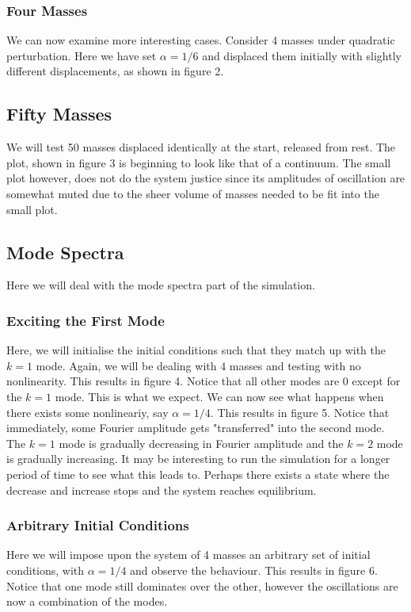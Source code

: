 \documentclass{article}
\begin{document}
\subsubsection{Four Masses}
We can now examine more interesting cases. Consider 4 masses under quadratic perturbation. 
Here we have set $\alpha=1/6$ and displaced them initially with slightly different displacements, as shown in figure 2.
\subsection{Fifty Masses}
We will test 50 masses displaced identically at the start, released from rest. The plot, 
shown in figure 3 is beginning to look 
like that of a continuum. The small plot however, does not do the system justice since 
its amplitudes of oscillation are somewhat muted due to the sheer volume of masses needed 
to be fit into the small plot.
\subsection{Mode Spectra}
Here we will deal with the mode spectra part of the simulation.
\subsubsection{Exciting the First Mode}
Here, we will initialise the initial 
conditions such that they match up with the $k=1$ mode. 
Again, we will be dealing with 4 masses and testing with no nonlinearity. This results in 
figure 4. Notice that all other modes are 0 except for the $k=1$ mode. This is what we expect. 
We can now see what happens when there exists some nonlineariy, say $\alpha=1/4$. This results in 
figure 5. Notice that immediately, some Fourier amplitude gets 
"transferred" into the second mode. The $k=1$ mode is gradually decreasing in Fourier amplitude 
and the $k=2$ mode is gradually increasing. It may be interesting to run the simulation for a longer 
period of time to see what this leads to. Perhaps there exists a state where the decrease and 
increase stops and the system reaches equilibrium.
\subsubsection{Arbitrary Initial Conditions}
Here we will impose upon the system of 4 masses an arbitrary set of initial conditions, with $\alpha=1/4$ and 
observe the behaviour. This results in figure 6. Notice that one mode still dominates over the other, however 
the oscillations are now a combination of the modes.
\end{document}
